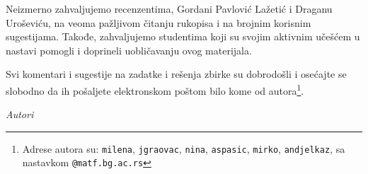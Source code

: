 \newpage
Neizmerno zahvaljujemo recenzentima, Gordani Pavlović Lažetić i Draganu Uroševiću, na veoma pažljivom čitanju rukopisa i na brojnim korisnim sugestijama. Takođe, zahvaljujemo studentima koji su svojim aktivnim učešćem u nastavi pomogli i doprineli uobličavanju ovog materijala. 

Svi komentari i sugestije na zadatke i rešenja zbirke su dobrodošli i osećajte se slobodno da ih pošaljete elektronskom poštom bilo kome od autora\footnote{Adrese autora su: \texttt{milena}, \texttt{jgraovac}, \texttt{nina}, \texttt{aspasic}, \texttt{mirko}, \texttt{andjelkaz}, sa nastavkom \texttt{@matf.bg.ac.rs}}. 



\bigskip

\begin{flushright}
{\em Autori}
\end{flushright}
